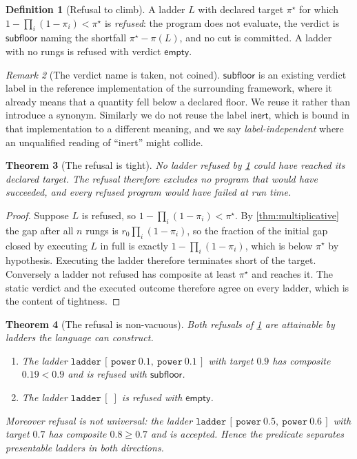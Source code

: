 \documentclass[11pt,twocolumn,a4paper]{article}
\theoremstyle{plain}
\newtheorem{theorem}{Theorem}[section]
\theoremstyle{definition}
\newtheorem{definition}[theorem]{Definition}
\theoremstyle{remark}
\newtheorem{remark}[theorem]{Remark}
\newcommand{\pow}{\pi}
\newcommand{\gap}{r}
\newcommand{\Lad}{L}
\newcommand{\shk}[1]{\texttt{#1}}
\begin{document}
\begin{definition}[Refusal to climb]
\label{def:refuse-climb}
A ladder $\Lad$ with declared target $\pow^\star$ for which
$1-\prod_i(1-\pow_i)<\pow^\star$ is \emph{refused}: the program does not
evaluate, the verdict is $\textsf{subfloor}$ naming the shortfall
$\pow^\star-\pow(\Lad)$, and no cut is committed. A ladder with no rungs is
refused with verdict $\textsf{empty}$.
\end{definition}

\begin{remark}[The verdict name is taken, not coined]
\label{rem:subfloor}
$\textsf{subfloor}$ is an existing verdict label in the reference
implementation of the surrounding framework, where it already means that a
quantity fell below a declared floor. We reuse it rather than introduce a
synonym. Similarly we do not reuse the label $\textsf{inert}$, which is bound
in that implementation to a different meaning, and we say
\emph{label-independent} where an unqualified reading of ``inert'' might
collide.
\end{remark}

\begin{theorem}[The refusal is tight]
\label{thm:tight}
No ladder refused by \cref{def:refuse-climb} could have reached its declared
target. The refusal therefore excludes no program that would have succeeded,
and every refused program would have failed at run time.
\end{theorem}

\begin{proof}
Suppose $\Lad$ is refused, so $1-\prod_i(1-\pow_i)<\pow^\star$. By
\cref{thm:multiplicative} the gap after all $n$ rungs is
$\gap_0\prod_i(1-\pow_i)$, so the fraction of the initial gap closed by
executing $\Lad$ in full is exactly $1-\prod_i(1-\pow_i)$, which is below
$\pow^\star$ by hypothesis. Executing the ladder therefore terminates short of
the target. Conversely a ladder not refused has composite at least
$\pow^\star$ and reaches it. The static verdict and the executed outcome
therefore agree on every ladder, which is the content of tightness.
\end{proof}

\begin{theorem}[The refusal is non-vacuous]
\label{thm:nonvacuous}
Both refusals of \cref{def:refuse-climb} are attainable by ladders the language
can construct.
\begin{enumerate}[label=(\roman*),leftmargin=1.8em,itemsep=2pt]
\item The ladder $\shk{ladder}\,[\,\shk{power}\ 0.1,\ \shk{power}\ 0.1\,]$ with
target $0.9$ has composite $0.19<0.9$ and is refused with
$\textsf{subfloor}$.
\item The ladder $\shk{ladder}\,[\;]$ is refused with $\textsf{empty}$.
\end{enumerate}
Moreover refusal is not universal: the ladder
$\shk{ladder}\,[\,\shk{power}\ 0.5,\ \shk{power}\ 0.6\,]$ with target $0.7$ has
composite $0.8\ge0.7$ and is accepted. Hence the predicate separates
presentable ladders in both directions.
\end{theorem}
\end{document}
